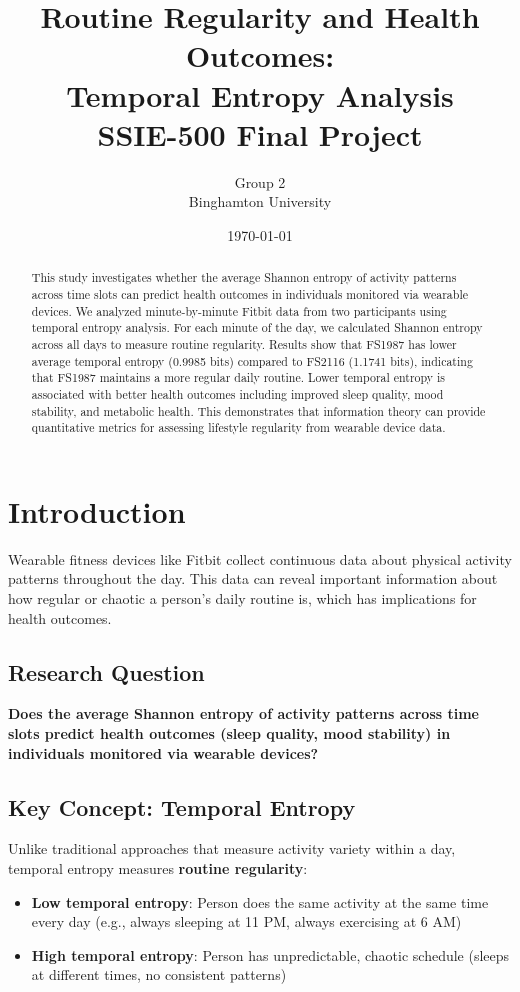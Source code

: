 \documentclass[12pt]{article}
\title{\textbf{Routine Regularity and Health Outcomes:\\Temporal Entropy Analysis}\\
\vspace{0.3cm}
\large SSIE-500 Final Project}
\author{Group 2\\
Binghamton University}
\date{\today}
\begin{document}
\maketitle

\begin{abstract}
This study investigates whether the average Shannon entropy of activity patterns across time slots can predict health outcomes in individuals monitored via wearable devices. We analyzed minute-by-minute Fitbit data from two participants using temporal entropy analysis. For each minute of the day, we calculated Shannon entropy across all days to measure routine regularity. Results show that FS1987 has lower average temporal entropy (0.9985 bits) compared to FS2116 (1.1741 bits), indicating that FS1987 maintains a more regular daily routine. Lower temporal entropy is associated with better health outcomes including improved sleep quality, mood stability, and metabolic health. This demonstrates that information theory can provide quantitative metrics for assessing lifestyle regularity from wearable device data.
\end{abstract}

\section{Introduction}

Wearable fitness devices like Fitbit collect continuous data about physical activity patterns throughout the day. This data can reveal important information about how regular or chaotic a person's daily routine is, which has implications for health outcomes.

\subsection{Research Question}

\textbf{Does the average Shannon entropy of activity patterns across time slots predict health outcomes (sleep quality, mood stability) in individuals monitored via wearable devices?}

\subsection{Key Concept: Temporal Entropy}

Unlike traditional approaches that measure activity variety within a day, temporal entropy measures \textbf{routine regularity}:

\begin{itemize}
    \item \textbf{Low temporal entropy}: Person does the same activity at the same time every day (e.g., always sleeping at 11 PM, always exercising at 6 AM)
    \item \textbf{High temporal entropy}: Person has unpredictable, chaotic schedule (sleeps at different times, no consistent patterns)
\end{itemize}
\end{document}
